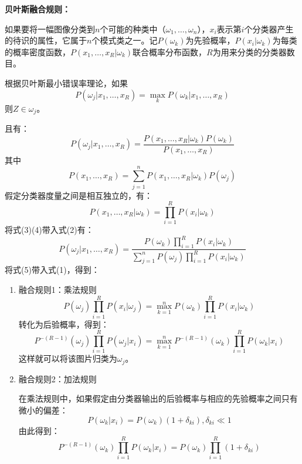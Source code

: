 \textbf{贝叶斯融合规则：}

如果要将一幅图像分类到$n$个可能的种类中（$\omega_{1},\dots,\omega_{n}$），$x_{i}$表示第$i$个分类器产生的待识的属性，它属于$n$个模式类之一。记$P(\omega_{k})$为先验概率，$P(x_{i}|\omega_{k})$为每类的概率密度函数，$P(x_{1},\dots,x_{R}|\omega_{k})$联合概率分布函数，$R$为用来分类的分类器数目。

根据贝叶斯最小错误率理论，如果
\begin{equation}
P(\omega_{j}|x_{1},\dots,x_{R})=\max_{k}P(\omega_{k}|x_{1},\dots,x_{R})
\end{equation}
则$Z\in\omega_{j}$。

且有：
\begin{equation}
P(\omega_{j}|x_{1},\dots,x_{R})=\frac{P(x_{1},\dots,x_{R}|\omega_{k})P(\omega_{k})}{P(x_{1},\dots,x_{R})}
\end{equation}
其中
\begin{equation}
P(x_{1},\dots,x_{R})=\sum^{n}_{j=1}P(x_{1},\dots,x_{R}|\omega_{k})P(\omega_{j})
\end{equation}
假定分类器度量之间是相互独立的，有：
\begin{equation}
P(x_{1},\dots,x_{R}|\omega_{k})=\prod^{R}_{i=1}P(x_{i}|\omega_{k})
\end{equation}
将式(3)(4)带入式(2)有：
\begin{equation}
P(\omega_{j}|x_{1},\dots,x_{R})=\frac{P(\omega_{k})\prod^{R}_{i=1}P(x_{i}|\omega_{k})}{\sum^{n}_{j=1}P(\omega_{j})\prod^{R}_{i=1}P(x_{i}|\omega_{k})}
\end{equation}
将式(5)带入式(1)，得到：
\begin{enumerate}
\item 融合规则1：乘法规则
    \begin{equation}
    P(\omega_{j})\prod^{R}_{i=1}P(x_{i}|\omega_{j})=\max^{n}_{k=1}P(\omega_{k})\prod^{R}_{i=1}P(x_{i}|\omega_{k})
    \end{equation}
    转化为后验概率，得到：
    \begin{equation}
    P^{-(R-1)}(\omega_{j})\prod^{R}_{i=1}P(\omega_{j}|x_{i})=\max^{n}_{k=1}P^{-(R-1)}(\omega_{k})\prod^{R}_{i=1}P(\omega_{k}|x_{i})
    \end{equation}
    这样就可以将该图片归类为$\omega_{j}$。
\item 融合规则2：加法规则

    在乘法规则中，如果假定由分类器输出的后验概率与相应的先验概率之间只有微小的偏差：
    \begin{equation}
    P(\omega_{k}|x_{i})=P(\omega_{k})(1+\delta_{ki}), \delta_{ki}\ll1
    \end{equation}
    由此得到：
    \begin{equation}
    P^{-(R-1)}(\omega_{k})\prod^{R}_{i=1}P(\omega_{k}|x_{i})=P(\omega_{k})\prod^{R}_{i=1}(1+\delta_{ki})
    \end{equation}
\end{enumerate}


\begin{comment}
\begin{itemize}
\item 基于灰度共生矩阵的方法
\item 灰度-梯度共生矩阵分析法
\item 灰度行程长度统计法
\item 小波分析法
\item 基于Gabor小波变换的纹理分析法
\end{itemize}
\end{comment}